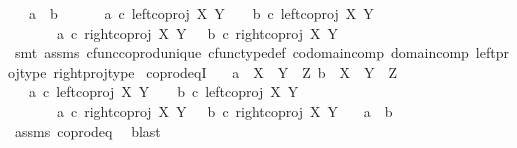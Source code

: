 \begin{isabellebody}
\ \ \ {\isachardoublequoteopen}a\ {\isacharequal}{\kern0pt}\ b\ {\isasymlongleftrightarrow}\ \isanewline
\ \ \ \ {\isacharparenleft}{\kern0pt}a\ {\isasymcirc}\isactrlsub c\ left{\isacharunderscore}{\kern0pt}coproj\ X\ Y\ \ \ {\isacharequal}{\kern0pt}\ b\ {\isasymcirc}\isactrlsub c\ left{\isacharunderscore}{\kern0pt}coproj\ X\ Y\ \isanewline
\ \ \ \ \ \ {\isasymand}\ a\ {\isasymcirc}\isactrlsub c\ right{\isacharunderscore}{\kern0pt}coproj\ X\ Y\ \ {\isacharequal}{\kern0pt}\ b\ {\isasymcirc}\isactrlsub c\ right{\isacharunderscore}{\kern0pt}coproj\ X\ Y{\isacharparenright}{\kern0pt}{\isachardoublequoteclose}\isanewline
%
\isadelimproof
\ \ %
\endisadelimproof
%
\isatagproof
{}\isamarkupfalse%
\ {\isacharparenleft}{\kern0pt}smt\ assms\ cfunc{\isacharunderscore}{\kern0pt}coprod{\isacharunderscore}{\kern0pt}unique\ cfunc{\isacharunderscore}{\kern0pt}type{\isacharunderscore}{\kern0pt}def\ codomain{\isacharunderscore}{\kern0pt}comp\ domain{\isacharunderscore}{\kern0pt}comp\ left{\isacharunderscore}{\kern0pt}proj{\isacharunderscore}{\kern0pt}type\ right{\isacharunderscore}{\kern0pt}proj{\isacharunderscore}{\kern0pt}type{\isacharparenright}{\kern0pt}%
\endisatagproof
{\isafoldproof}%
%
\isadelimproof
\isanewline
%
\endisadelimproof
\isanewline
{}\isamarkupfalse%
\ coprod{\isacharunderscore}{\kern0pt}eqI{\isacharcolon}{\kern0pt}\isanewline
\ \ \ {\isachardoublequoteopen}a\ {\isacharcolon}{\kern0pt}\ X\ {\isasymCoprod}\ Y\ {\isasymrightarrow}\ Z{\isachardoublequoteclose}\ {\isachardoublequoteopen}b\ {\isacharcolon}{\kern0pt}\ X\ {\isasymCoprod}\ Y\ {\isasymrightarrow}\ Z{\isachardoublequoteclose}\isanewline
\ \ \ {\isachardoublequoteopen}{\isacharparenleft}{\kern0pt}a\ {\isasymcirc}\isactrlsub c\ left{\isacharunderscore}{\kern0pt}coproj\ X\ Y\ \ \ {\isacharequal}{\kern0pt}\ b\ {\isasymcirc}\isactrlsub c\ left{\isacharunderscore}{\kern0pt}coproj\ X\ Y\ \isanewline
\ \ \ \ \ \ {\isasymand}\ a\ {\isasymcirc}\isactrlsub c\ right{\isacharunderscore}{\kern0pt}coproj\ X\ Y\ \ {\isacharequal}{\kern0pt}\ b\ {\isasymcirc}\isactrlsub c\ right{\isacharunderscore}{\kern0pt}coproj\ X\ Y{\isacharparenright}{\kern0pt}{\isachardoublequoteclose}\isanewline
\ \ \ {\isachardoublequoteopen}a\ {\isacharequal}{\kern0pt}\ b{\isachardoublequoteclose}\isanewline
%
\isadelimproof
\ \ %
\endisadelimproof
%
\isatagproof
{}\isamarkupfalse%
\ assms\ coprod{\isacharunderscore}{\kern0pt}eq\ \isamarkupfalse%
\ blast%
\endisatagproof
{\isafoldproof}%
%
\isadelimproof

\end{isabellebody}
